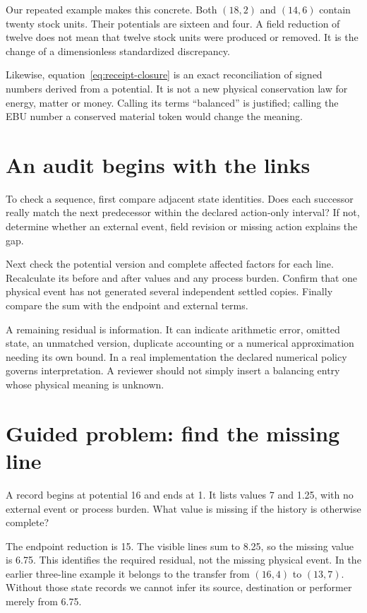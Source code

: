 Our repeated example makes this concrete. Both $(18,2)$ and $(14,6)$ contain twenty stock units. Their potentials are sixteen and four. A field reduction of twelve does not mean that twelve stock units were produced or removed. It is the change of a dimensionless standardized discrepancy.

Likewise, equation~\eqref{eq:receipt-closure} is an exact reconciliation of signed numbers derived from a potential. It is not a new physical conservation law for energy, matter or money. Calling its terms ``balanced'' is justified; calling the EBU number a conserved material token would change the meaning.

\section{An audit begins with the links}
To check a sequence, first compare adjacent state identities. Does each successor really match the next predecessor within the declared action-only interval? If not, determine whether an external event, field revision or missing action explains the gap.

Next check the potential version and complete affected factors for each line. Recalculate its before and after values and any process burden. Confirm that one physical event has not generated several independent settled copies. Finally compare the sum with the endpoint and external terms.

A remaining residual is information. It can indicate arithmetic error, omitted state, an unmatched version, duplicate accounting or a numerical approximation needing its own bound. In a real implementation the declared numerical policy governs interpretation. A reviewer should not simply insert a balancing entry whose physical meaning is unknown.

\section{Guided problem: find the missing line}
A record begins at potential 16 and ends at 1. It lists values 7 and 1.25, with no external event or process burden. What value is missing if the history is otherwise complete?

The endpoint reduction is 15. The visible lines sum to 8.25, so the missing value is 6.75. This identifies the required residual, not the missing physical event. In the earlier three-line example it belongs to the transfer from $(16,4)$ to $(13,7)$. Without those state records we cannot infer its source, destination or performer merely from 6.75.

